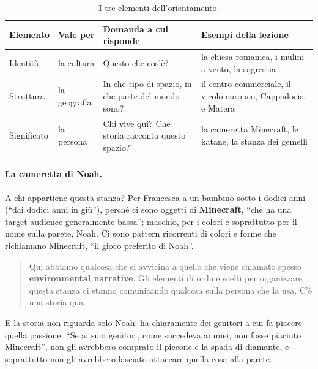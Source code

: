 \begin{table}[ht]
\centering
\small
\begin{tabular}{@{}p{}p{}p{}p{}@{}}
\toprule
\textbf{Elemento} & \textbf{Vale per} & \textbf{Domanda a cui risponde} &
  \textbf{Esempi della lezione} \\
\midrule
Identità & la cultura & Questo che cos'è? &
  la chiesa romanica, i mulini a vento, la sagrestia \\
Struttura & la geografia & In che tipo di spazio, in che parte del mondo sono? &
  il centro commerciale, il vicolo europeo, Cappadocia e Matera \\
Significato & la persona & Chi vive qui? Che storia racconta questo spazio? &
  la cameretta Minecraft, le katane, la stanza dei gemelli \\
\bottomrule
\end{tabular}
\caption{I tre elementi dell'orientamento.}
\label{gd17:tab:orientamento}
\end{table}

\paragraph{La cameretta di Noah.} A chi appartiene questa stanza? Per Francesca a un
bambino sotto i dodici anni (``dai dodici anni in giù''), perché ci sono oggetti di
\textbf{Minecraft}, ``che ha una target audience generalmente bassa''; maschio, per i
colori e soprattutto per il nome sulla parete, Noah. Ci sono pattern ricorrenti di colori
e forme che richiamano Minecraft, ``il gioco preferito di Noah''.
\begin{quote}
Qui abbiamo qualcosa che si avvicina a quello che viene chiamato spesso
\textbf{environmental narrative}. Gli elementi di ordine scelti per organizzare questa
stanza ci stanno comunicando qualcosa sulla persona che la usa. C'è una storia qua.
\end{quote}
E la storia non riguarda solo Noah: ha chiaramente dei genitori a cui fa piacere quella
passione. ``Se ai suoi genitori, come succedeva ai miei, non fosse piaciuto Minecraft'',
non gli avrebbero comprato il piccone e la spada di diamante, e soprattutto non gli
avrebbero lasciato attaccare quella cosa alla parete.

